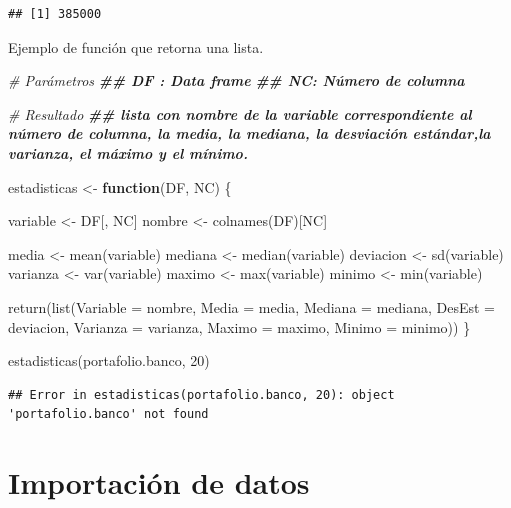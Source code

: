 \documentclass[
  12pt,
]{book}
\newenvironment{Shaded}{\begin{snugshade}}{\end{snugshade}}
\newcommand{\AttributeTok}[1]{\textcolor[rgb]{0.77,0.63,0.00}{#1}}
\newcommand{\CommentTok}[1]{\textcolor[rgb]{0.56,0.35,0.01}{\textit{#1}}}
\newcommand{\ControlFlowTok}[1]{\textcolor[rgb]{0.13,0.29,0.53}{\textbf{#1}}}
\newcommand{\DecValTok}[1]{\textcolor[rgb]{0.00,0.00,0.81}{#1}}
\newcommand{\DocumentationTok}[1]{\textcolor[rgb]{0.56,0.35,0.01}{\textbf{\textit{#1}}}}
\newcommand{\FunctionTok}[1]{\textcolor[rgb]{0.00,0.00,0.00}{#1}}
\newcommand{\NormalTok}[1]{#1}
\newcommand{\OtherTok}[1]{\textcolor[rgb]{0.56,0.35,0.01}{#1}}
\begin{document}
\begin{verbatim}
## [1] 385000
\end{verbatim}

Ejemplo de función que retorna una lista.

\begin{Shaded}
\begin{Highlighting}[]
\CommentTok{\# Parámetros}
\DocumentationTok{\#\# DF : Data frame}
\DocumentationTok{\#\# NC: Número de columna}

\CommentTok{\# Resultado}
\DocumentationTok{\#\# lista con nombre de la variable correspondiente al número de columna, la media, la mediana, la desviación estándar,la varianza, el máximo y el mínimo.}

\NormalTok{estadisticas }\OtherTok{\textless{}{-}} \ControlFlowTok{function}\NormalTok{(DF, NC) \{}

\NormalTok{  variable }\OtherTok{\textless{}{-}}\NormalTok{ DF[, NC]}
\NormalTok{  nombre }\OtherTok{\textless{}{-}} \FunctionTok{colnames}\NormalTok{(DF)[NC]}

\NormalTok{  media }\OtherTok{\textless{}{-}} \FunctionTok{mean}\NormalTok{(variable)}
\NormalTok{  mediana }\OtherTok{\textless{}{-}} \FunctionTok{median}\NormalTok{(variable)}
\NormalTok{  deviacion }\OtherTok{\textless{}{-}} \FunctionTok{sd}\NormalTok{(variable)}
\NormalTok{  varianza }\OtherTok{\textless{}{-}} \FunctionTok{var}\NormalTok{(variable)}
\NormalTok{  maximo }\OtherTok{\textless{}{-}} \FunctionTok{max}\NormalTok{(variable)}
\NormalTok{  minimo }\OtherTok{\textless{}{-}} \FunctionTok{min}\NormalTok{(variable)}

  \FunctionTok{return}\NormalTok{(}\FunctionTok{list}\NormalTok{(}\AttributeTok{Variable =}\NormalTok{ nombre, }\AttributeTok{Media =}\NormalTok{ media, }\AttributeTok{Mediana =}\NormalTok{ mediana, }\AttributeTok{DesEst =}\NormalTok{ deviacion, }\AttributeTok{Varianza =}\NormalTok{ varianza, }\AttributeTok{Maximo =}\NormalTok{ maximo, }\AttributeTok{Minimo =}\NormalTok{ minimo))}
\NormalTok{\}}


\FunctionTok{estadisticas}\NormalTok{(portafolio.banco, }\DecValTok{20}\NormalTok{)}
\end{Highlighting}
\end{Shaded}

\begin{verbatim}
## Error in estadisticas(portafolio.banco, 20): object 'portafolio.banco' not found
\end{verbatim}

\hypertarget{importaciuxf3n-de-datos}{%
\chapter{\texorpdfstring{\textbf{Importación de datos}}{Importación de datos}}\label{importaciuxf3n-de-datos}}
\end{document}
